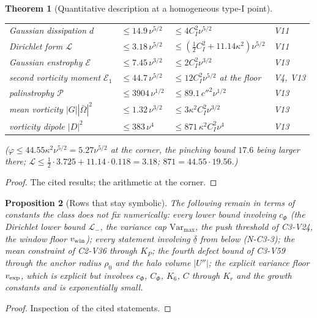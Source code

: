 \documentclass[11pt]{article}
\theoremstyle{plain}
\newtheorem{theorem}{Theorem}[section]
\newtheorem{proposition}[theorem]{Proposition}
\theoremstyle{definition}
\theoremstyle{remark}
\begin{document}
\begin{theorem}[Quantitative description at a homogeneous type-I point]
\begin{center}
\begin{tabular}{@{}p{}p{}p{}p{}@{}}
Gaussian dissipation \(d\) & \(\le14.9\,\nu^{5/2}\) & \(\le4C_I^2\nu^{5/2}\) & V11\\
Dirichlet form \(\mathcal L\) & \(\le3.18\,\nu^{5/2}\) & \(\le(\frac12C_I^2+11.14\kappa^2)\nu^{5/2}\) & V11\\
Gaussian enstrophy \(\mathcal E\) & \(\le7.45\,\nu^{3/2}\) & \(\le2C_I^2\nu^{3/2}\) & V13\\
second vorticity moment \(\mathcal E_1\) & \(\le44.7\,\nu^{5/2}\) & \(\le12C_I^2\nu^{5/2}\) at the floor & V4, V13\\
palinstrophy \(\mathcal P\) & \(\le3904\,\nu^{1/2}\) & \(\le89.1\,c''^2\nu^{1/2}\) & V13\\
mean vorticity \(|G||\bar\Omega|^2\) & \(\le1.32\,\nu^{3/2}\) & \(\le3\kappa^2C_I^2\nu^{3/2}\) & V13\\
vorticity dipole \(|D|^2\) & \(\le383\,\nu^4\) & \(\le871\,\kappa^2C_I^2\nu^4\) & V13\\
\bottomrule
\end{tabular}
\end{center}
\medskip

\noindent
(\(\varphi\le44.55\kappa^2\nu^{5/2}=5.27\nu^{5/2}\) at the corner, the pinching bound \(17.6\) being
larger there; \(\mathcal L\le\frac12\cdot3.725+11.14\cdot0.118=3.18\); \(871=44.55\cdot19.56\).)
\end{theorem}

\begin{proof}
The cited results; the arithmetic at the corner.
\end{proof}

\begin{proposition}[Rows that stay symbolic]
\label{prop:c4v14-symbolic}
The following remain in terms of constants the class does not fix
numerically: every lower bound involving \(c_\Phi\) (the Dirichlet lower
bound \(\mathcal L_-\), the variance cap \(\mathrm{Var}_{\max}\), the push threshold of C3-V24,
the window floor \(v_{\rm win}\)); every statement involving \(\underline\delta\) from below
(N-C3-3); the mean constraint of C2-V36 through \(K_P\); the fourth
defect bound of C3-V59 through the anchor radius \(\rho_0\) and the halo
volume \(|U''|\); the explicit variance floor \(v_{\rm exp}\), which is explicit
but involves \(c_\Phi\), \(C_\Phi\), \(K_6\), \(C\) through \(K_r\) and the growth constants
and is exponentially small.
\end{proposition}

\begin{proof}
Inspection of the cited statements.
\end{proof}
\end{document}
